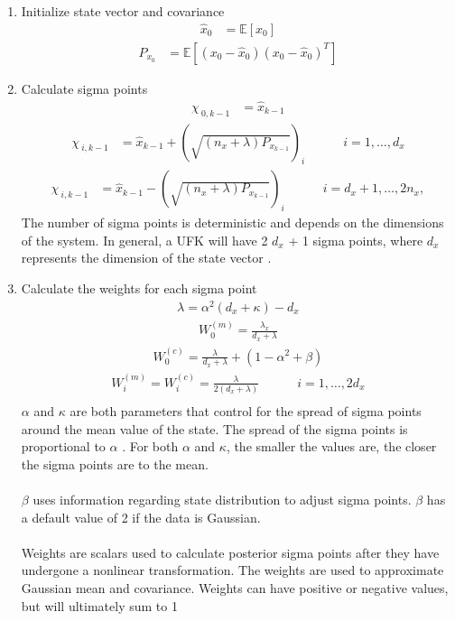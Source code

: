 \begin{enumerate}
    \item Initialize state vector and covariance
    \begin{align*}
        \hat{x}_{0} &= \mathbb{E}[x_{0}] 
       \end{align*}
        \begin{align*}
        P_{x_{0}} &= \mathbb{E}[(x_{0}-\hat{x}_{0})(x_{0}-\hat{x}_{0})^{T}] 
    \end{align*}
    \item Calculate sigma points
    \begin{align*}
        \chi_{\ 0,k-1} &= \hat{x}_{k-1} 
     \end{align*}
     \begin{align*}
        \chi_{\ i,k-1} &= \hat{x}_{k-1} + (\sqrt{(n_{x}+\lambda)P_{x_{k-1}}})_{i} \quad \quad \quad i=1,\dots,d_{x} 
        \end{align*}
        \begin{align*}
        \chi_{\ i,k-1} &= \hat{x}_{k-1} - (\sqrt{(n_{x}+\lambda)P_{x_{k-1}}})_{i} \quad \quad \quad  i=d_{x}+1,\dots,2n_{x},
    \end{align*}
    The number of sigma points is deterministic and depends on the dimensions of the system. 
    In general, a UFK will have 2 $d_x$ + 1 sigma points, where $d_x$ represents the dimension of the state vector \cite{inbook, inproceedings, Wan01theunscented}. 
    \item Calculate the weights for each sigma point 
    \begin{align*}
        \lambda = \alpha^{2}(d_{x}+\kappa)-d_{x} 
         \end{align*}
        \begin{align*}
        W^{(m)}_{0} = \frac{\lambda_{x}}{d_{x}+ \lambda} 
         \end{align*}
        \begin{align*}
        W^{(c)}_{0} = \frac{\lambda}{d_{x}+ \lambda} + (1 - \alpha^{2} + \beta) 
         \end{align*}
        \begin{align*}
        W^{(m)}_{i} = W^{(c)}_{i} = \frac{\lambda}{2(d_{x}+ \lambda) } \quad \quad \quad i=1,\dots,2d_{x} \\
            \end{align*}
       $\alpha$ and $\kappa$ are both parameters that control for the spread of sigma points around the mean value of the state. The spread of the sigma points is proportional to $\alpha$ . For both $\alpha$ and $\kappa $,  the smaller the values are, the closer the sigma points are to the mean.\\ \\
       $\beta$ uses information regarding state distribution to adjust sigma points. $\beta$ has a default value of 2 if the data is Gaussian. \\ \\
    Weights are scalars used to calculate posterior sigma points after they have undergone a nonlinear transformation. The weights are used to approximate Gaussian mean and covariance. Weights can have positive or negative values, but will ultimately sum to 1 \cite{article6}
    

\end{enumerate}
